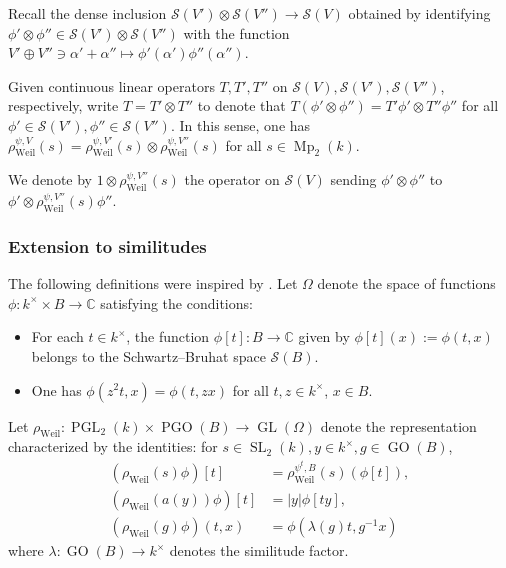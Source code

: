 \documentclass[reqno,10pt]{amsart}
\theoremstyle{plain} %
\theoremstyle{definition}
\theoremstyle{plain} %
\theoremstyle{remark}
\theoremstyle{itplain} %
\theoremstyle{remark} %
\numberwithin{equation}{section}
\DeclareMathOperator{\SL}{SL}
\DeclareMathOperator{\Mp}{Mp}
\DeclareMathOperator{\GL}{GL}
\DeclareMathOperator{\GO}{GO}
\DeclareMathOperator{\PGO}{PGO}
\def\PGL{\operatorname{PGL}}
\DeclareMathOperator{\Weil}{Weil}
\begin{document}
Recall the dense inclusion $\mathcal{S}(V') \otimes \mathcal{S}(V'') \rightarrow \mathcal{S}(V)$ obtained by identifying $\phi ' \otimes \phi '' \in \mathcal{S}(V') \otimes \mathcal{S}(V'')$ with the function $V' \oplus V'' \ni \alpha ' + \alpha '' \mapsto \phi '(\alpha ') \phi '' (\alpha '')$.

Given continuous linear operators $T, T', T''$ on $\mathcal{S}(V), \mathcal{S}(V'), \mathcal{S}(V'')$, respectively, write $T = T' \otimes T''$ to denote that $T (\phi ' \otimes \phi '') = T' \phi ' \otimes T'' \phi ''$ for all $\phi ' \in \mathcal{S}(V'), \phi '' \in \mathcal{S}(V'')$.  In this sense, one has $\rho_{\Weil}^{\psi, V}(s) = \rho_{\Weil}^{\psi, V'}(s) \otimes \rho_{\Weil}^{\psi, V''}(s)$ for all $s \in \Mp_2(k)$.

We denote by $1 \otimes \rho_{\Weil}^{\psi, V''}(s)$ the operator on $\mathcal{S}(V)$ sending $\phi ' \otimes \phi ''$ to $\phi ' \otimes \rho_{\Weil}^{\psi,V''}(s) \phi ''$.



\subsubsection{Extension to similitudes\label{sec:defn-local-omega}}
\label{sec-2-2-5}
The following definitions were inspired by \cite[I.3]{MR783511}.  Let $\Omega$ denote the space of functions $\phi : k^\times \times B \rightarrow \mathbb{C}$ satisfying the conditions:
\begin{itemize}
\item For each $t \in k^\times$, the function $\phi[t] : B \rightarrow \mathbb{C}$ given by $\phi[t](x) := \phi(t,x)$ belongs to the Schwartz--Bruhat space $\mathcal{S}(B)$.
\item One has $\phi(z^2 t, x) = \phi(t, z x)$ for all $t,z \in k^\times$, $x \in B$.
\end{itemize}
Let $\rho_{\Weil} : \PGL_2(k) \times \PGO(B) \rightarrow \GL(\Omega)$ denote the representation characterized by the identities: for $s \in \SL_2(k), y \in k^\times, g \in \GO(B)$,
\begin{align*}
  (\rho_{\Weil}(s) \phi)[t]
  &= \rho_{\Weil}^{\psi^t,B}(s) (\phi[t]),
  \\
  (\rho_{\Weil}(a(y)) \phi)[t]
  &=
    |y| \phi[t y],
  \\
  (\rho_{\Weil}(g) \phi)(t,x)
  &=
    \phi(\lambda(g) t, g^{-1} x)
\end{align*}
where $\lambda : \GO(B) \rightarrow k^\times$ denotes the similitude factor.
\end{document}
